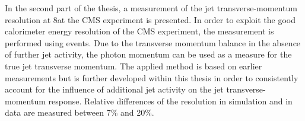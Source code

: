In the second part of the thesis, a measurement of the jet transverse-momentum resolution at 8\tev at the CMS experiment is presented.
In order to exploit the good calorimeter energy resolution of the CMS experiment, the measurement is performed using \GAMJET events.
Due to the transverse momentum balance in the absence of further jet activity, the photon momentum can be used as a measure for the true jet transverse momentum. 
The applied method is based on earlier measurements but is further developed within this thesis in order to consistently account for the influence of additional jet activity on the jet transverse-momentum response.
Relative differences of the resolution in simulation and in data are measured between 7\% and 20\%. 

\cleardoublepage
